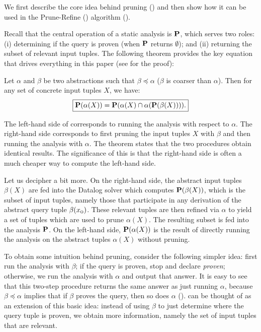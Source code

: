 
We first describe the core
idea behind pruning () and then show how it can be used in the
Prune-Refine (\PR) algorithm ().


Recall that the central operation of a static analysis is $\mathbf{P}$, which serves two roles: (i)
determining if the query is proven (when $\mathbf{P}$ returns $\emptyset$); and (ii)
returning the subset of relevant input tuples.
The following theorem provides the key equation that drives everything in this paper (see  for the proof):

\begin{theorem}
\label{thm:master}
Let $\alpha$ and $\beta$ be two abstractions such that $\beta \preceq \alpha$
($\beta$ is coarser than $\alpha$).
Then for any set of concrete input tuples $X$, we have:
\begin{align}
\label{eqn:master}
\boxed{
\mathbf{P}(\alpha(X)) = \mathbf{P}(\alpha(X) \cap \alpha(\mathbf{P}(\beta(X)))).
}
\end{align}
\end{theorem}

The left-hand side of  corresponds to running the analysis with respect to $\alpha$.
The right-hand side corresponds to first pruning the input tuples $X$
with $\beta$ and then running the analysis with $\alpha$.
The theorem states that the two procedures obtain identical results.
The significance of this is that the right-hand side is often a much cheaper
way to compute the left-hand side.

Let us decipher  a bit more.
On the right-hand side,
the abstract input tuples $\beta(X)$
are fed into the Datalog solver which computes $\mathbf{P}(\beta(X))$,
which is the subset of input tuples, namely those that participate in any derivation of the abstract query tuple $\beta(x_\text{\sc o})$.
These relevant tuples are then refined via $\alpha$ to yield a set of tuples which are used to prune $\alpha(X)$.
The resulting subset is fed into the analysis $\mathbf{P}$.
On the left-hand side, $\mathbf{P}(\alpha(X))$ is the result of directly running the analysis
on the abstract tuples $\alpha(X)$ without pruning.

To obtain some intuition behind pruning,
consider the following simpler idea:
first run the analysis with $\beta$; if the query is proven, stop and declare {\em proven}; otherwise, we run the analysis
with $\alpha$ and output that answer.
It is easy to see that this two-step procedure returns the same answer as just running $\alpha$,
because $\beta \preceq \alpha$ implies that if $\beta$ proves the query, then so does $\alpha$
().
 can be thought of as an extension of this basic idea:
instead of using $\beta$ to just determine where the query tuple is proven,
we obtain more information, namely the set of input tuples that are relevant.

